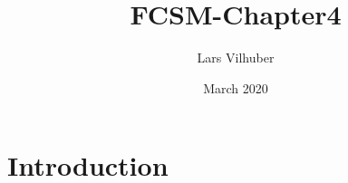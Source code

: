 \documentclass{article}
\title{FCSM-Chapter4}
\author{Lars Vilhuber}
\date{March 2020}
\begin{document}
\maketitle

\section{Introduction}
\end{document}

